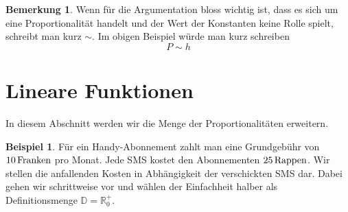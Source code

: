 \documentclass[%
11pt,%
twoside,%
titlepage,%
swissgerman,%
headsepline%
]{scrartcl}
\theoremstyle{definition}
\newtheorem{bsp}{Beispiel}[subsection] %
\newtheorem{bem}{Bemerkung}[subsection] %
\theoremstyle{plain}
\begin{document}
	\begin{bem}
		Wenn für die Argumentation bloss wichtig ist, dass es sich um eine Proportionalität handelt und der Wert der Konstanten keine Rolle spielt, schreibt man kurz \glqq$\sim$\grqq. Im obigen Beispiel würde man kurz schreiben
		$$P\sim h$$
	\end{bem}
	
	\section{Lineare Funktionen}
	
	In diesem Abschnitt werden wir die Menge der Proportionalitäten erweitern.
	
	\begin{bsp}
		Für ein Handy-Abonnement zahlt man eine Grundgebühr von $\unit[10]{Franken}$ pro Monat. Jede SMS kostet den Abonnementen $\unit[25]{Rappen}$. Wir stellen die anfallenden Kosten in Abhängigkeit der verschickten SMS dar. Dabei gehen wir schrittweise vor und wählen der Einfachheit halber als Defini\-tions\-menge $\mathbb{D}=\mathbb{R}^+_0$.
		

\end{bsp}
\end{document}
